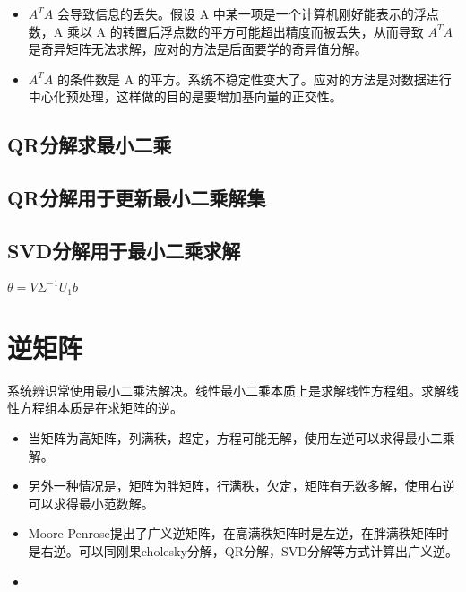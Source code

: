 \begin{itemize}
  \item $A^T A$ 会导致信息的丢失。假设 A 中某一项是一个计算机刚好能表示的浮点数，A 乘以 A 的转置后浮点数的平方可能超出精度而被丢失，从而导致 $A^T A$ 是奇异矩阵无法求解，应对的方法是后面要学的奇异值分解。
  \item $A^T A$ 的条件数是 A 的平方。系统不稳定性变大了。应对的方法是对数据进行中心化预处理，这样做的目的是要增加基向量的正交性。
\end{itemize}

\subsection{QR分解求最小二乘}
\subsection{QR分解用于更新最小二乘解集}

\begin{proofbox}
	
\end{proofbox}
\subsection{SVD分解用于最小二乘求解}
\begin{theorembox}
	$\theta = V\Sigma ^{-1}U_1b$
\end{theorembox}

\section{逆矩阵}
\begin{theorembox}
	系统辨识常使用最小二乘法解决。线性最小二乘本质上是求解线性方程组。求解线性方程组本质是在求矩阵的逆。
	\begin{itemize}
  \item 当矩阵为高矩阵，列满秩，超定，方程可能无解，使用左逆可以求得最小二乘解。
  \item 另外一种情况是，矩阵为胖矩阵，行满秩，欠定，矩阵有无数多解，使用右逆可以求得最小范数解。
  \item Moore-Penrose提出了广义逆矩阵，在高满秩矩阵时是左逆，在胖满秩矩阵时是右逆。可以同刚果cholesky分解，QR分解，SVD分解等方式计算出广义逆。
  \item 
\end{itemize}
\end{theorembox}

